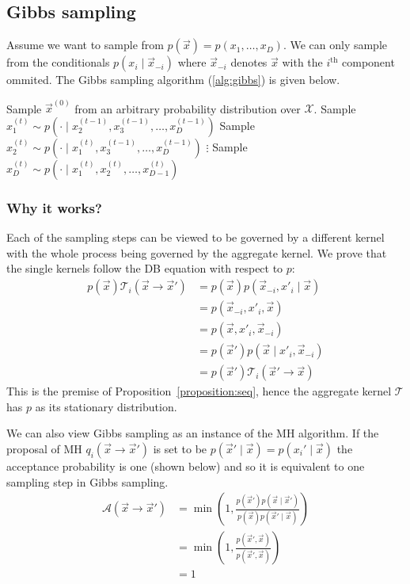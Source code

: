 \subsection{Gibbs sampling}
Assume we want to sample from $p(\vec x) = p(x_1, \dotsc, x_D)$. We can only sample from the conditionals $p(x_i \mid \vec x_{-i})$ where $\vec x_{-i}$ denotes $\vec x$ with the $i^{\text{th}}$ component ommited. The Gibbs sampling algorithm (\ref{alg:gibbs}) is given below.
\begin{algorithmbis}\label{alg:gibbs}
    \begin{algorithmic}[1]
        \State Sample $\vec x^{(0)}$ from an arbitrary probability distribution over $\mathcal X$.
            \State Sample $x_1^{(t)} \sim p\left(\cdot \mid x_2^{(t - 1)}, x_3^{(t - 1)}, \dotsc, x_D^{(t - 1)}\right)$
            \State Sample $x_2^{(t)} \sim p\left(\cdot \mid x_1^{(t)}, x_3^{(t - 1)}, \dotsc, x_D^{(t - 1)}\right)$
            \State $\vdots$
            \State Sample $x_D^{(t)} \sim p\left(\cdot \mid x_1^{(t)}, x_2^{(t)}, \dotsc, x_{D - 1}^{(t)}\right)$
        \EndFor
    \end{algorithmic}
\end{algorithmbis}

\subsubsection{Why it works?}
Each of the sampling steps can be viewed to be governed by a different kernel with the whole process being governed by the aggregate kernel. We prove that the single kernels follow the DB equation with respect to $p$:
\begin{align}
    p(\vec x) \mathcal T_i(\vec x \to \vec x')  &= p(\vec x) p(\vec x_{-i}, x'_i \mid \vec x) \\
                                                &= p(\vec x_{-i}, x'_i, \vec x) \\
                                                &= p(\vec x, x'_i, \vec x_{-i}) \\
                                                &= p(\vec x') p(\vec x \mid x'_i, \vec x_{-i}) \\
                                                &= p(\vec x') \mathcal T_i (\vec x' \to \vec x)
\end{align}
This is the premise of Proposition~\ref{proposition:seq}, hence the aggregate kernel $\mathcal T$ has $p$ as its stationary distribution.

We can also view Gibbs sampling as an instance of the MH algorithm. If the proposal of MH $q_i(\vec x \to \vec x')$ is set to be $p(\vec x' \mid \vec x) = p(x_i' \mid \vec x)$ the acceptance probability is one (shown below) and so it is equivalent to one sampling step in Gibbs sampling.
\begin{align}
    \mathcal A(\vec x \to \vec x')  &= \min\left(1, \frac{p(\vec x')p(\vec x \mid \vec x')}{p(\vec x)p(\vec x' \mid \vec x)}\right) \\
                                    &= \min\left(1, \frac{p(\vec x', \vec x)}{p(\vec x', \vec x)}\right) \\
                                    &= 1
\end{align}